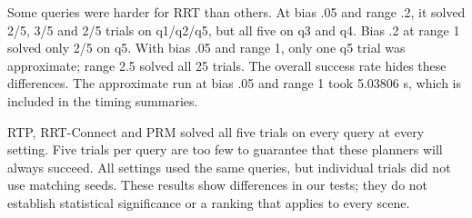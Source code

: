 Some queries were harder for RRT than others. At bias .05 and range .2, it solved 2/5, 3/5 and 2/5 trials on q1/q2/q5, but all five on q3 and q4. Bias .2 at range 1 solved only 2/5 on q5. With bias .05 and range 1, only one q5 trial was approximate; range 2.5 solved all 25 trials. The overall success rate hides these differences. The approximate run at bias .05 and range 1 took 5.03806 s, which is included in the timing summaries.

RTP, RRT-Connect and PRM solved all five trials on every query at every setting. Five trials per query are too few to guarantee that these planners will always succeed. All settings used the same queries, but individual trials did not use matching seeds. These results show differences in our tests; they do not establish statistical significance or a ranking that applies to every scene.
